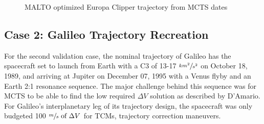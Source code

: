 \documentclass[letterpaper, preprint, paper,11pt]{AAS}	%
\newcommand*\circled[1]{\tikz[baseline=(char.base)]{
            \node[shape=circle,draw,inner sep=0.8pt] (char) {#1};}}
\begin{document}
\begin{figure}[t!]
    \centering
    \caption{MALTO optimized Europa Clipper trajectory from MCTS dates}
    \label{fig:clipMalto}
\end{figure}

\subsection{Case 2: Galileo Trajectory Recreation}

For the second validation case, the nominal trajectory of Galileo has the spacecraft set to launch from Earth with a C3 of 13-17 $\sfrac{km^2}{s^2}$ on October 18, 1989, and arriving at Jupiter on December 07, 1995 with a Venus flyby and an Earth 2:1 resonance sequence. The major challenge behind this sequence was for MCTS to be able to find the low required $\Delta V$ solution as described by D'Amario\cite{DAmario1992}. For Galileo's interplanetary leg of its trajectory design, the spacecraft was only budgeted 100 $\sfrac{m}{s} \text{ of } \Delta V$ for TCMs, trajectory correction maneuvers. 
\end{document}
